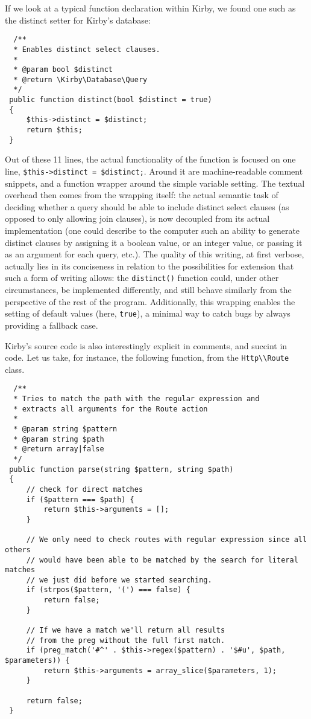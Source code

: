 If we look at a typical function declaration within Kirby, we found one such as the distinct setter for Kirby's database:

\begin{lstlisting}
  /**
  * Enables distinct select clauses.
  *
  * @param bool $distinct
  * @return \Kirby\Database\Query
  */
 public function distinct(bool $distinct = true)
 {
     $this->distinct = $distinct;
     return $this;
 }
\end{lstlisting}

Out of these 11 lines, the actual functionality of the function is focused on one line, \lstinline{$this->distinct = $distinct;}. Around it are machine-readable comment snippets, and a function wrapper around the simple variable setting. The textual overhead then comes from the wrapping itself: the actual semantic task of deciding whether a query should be able to include distinct select clauses (as opposed to only allowing join clauses), is now decoupled from its actual implementation (one could describe to the computer such an ability to generate distinct clauses by assigning it a boolean value, or an integer value, or passing it as an argument for each query, etc.). The quality of this writing, at first verbose, actually lies in its conciseness in relation to the possibilities for extension that such a form of writing allows: the \lstinline{distinct()} function could, under other circumstances, be implemented differently, and still behave similarly from the perspective of the rest of the program. Additionally, this wrapping enables the setting of default values (here, \lstinline{true}), a minimal way to catch bugs by always providing a fallback case.

Kirby's source code is also interestingly explicit in comments, and succint in code. Let us take, for instance, the following function, from the \lstinline{Http\\Route} class.

\begin{lstlisting}
  /**
  * Tries to match the path with the regular expression and
  * extracts all arguments for the Route action
  *
  * @param string $pattern
  * @param string $path
  * @return array|false
  */
 public function parse(string $pattern, string $path)
 {
     // check for direct matches
     if ($pattern === $path) {
         return $this->arguments = [];
     }

     // We only need to check routes with regular expression since all others
     // would have been able to be matched by the search for literal matches
     // we just did before we started searching.
     if (strpos($pattern, '(') === false) {
         return false;
     }

     // If we have a match we'll return all results
     // from the preg without the full first match.
     if (preg_match('#^' . $this->regex($pattern) . '$#u', $path, $parameters)) {
         return $this->arguments = array_slice($parameters, 1);
     }

     return false;
 }
\end{lstlisting}

